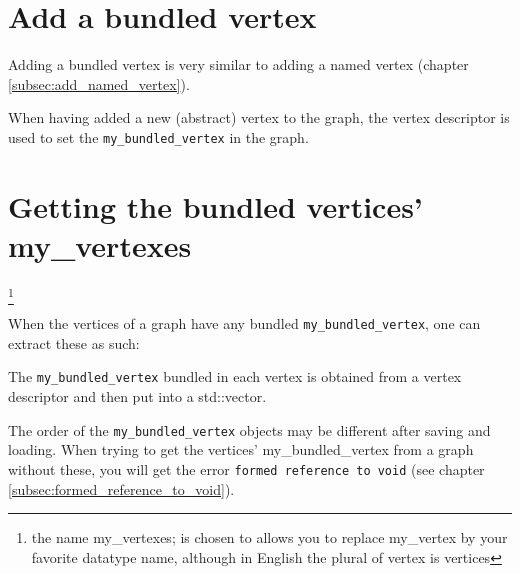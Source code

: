 \section{Add a bundled vertex}
\label{subsec:add_bundled_vertex}

Adding a bundled vertex is very similar to adding a named vertex 
(chapter \ref{subsec:add_named_vertex}).



When having added a new (abstract) vertex to the graph, the vertex descriptor
is used to set the \verb;my_bundled_vertex; in the graph.

\section{Getting the bundled vertices' my\_vertexes}
\footnote{
  the name my\_vertexes; is chosen to allows you to
  replace my\_vertex by your favorite datatype name,
  although in English the plural of vertex is vertices
}
\label{subsec:get_bundled_vertex_my_vertexes}

When the vertices of a graph have any bundled \verb;my_bundled_vertex;, one can
extract these as such:



The \verb;my_bundled_vertex; bundled in each vertex is obtained from a vertex
descriptor and then put into a std::vector.

The order of the \verb;my_bundled_vertex; objects may be different after saving
and loading.
When trying to get the vertices' my_bundled_vertex from a graph without
 these, you will get the error 
\verb;formed reference to void; (see chapter \ref{subsec:formed_reference_to_void}).

